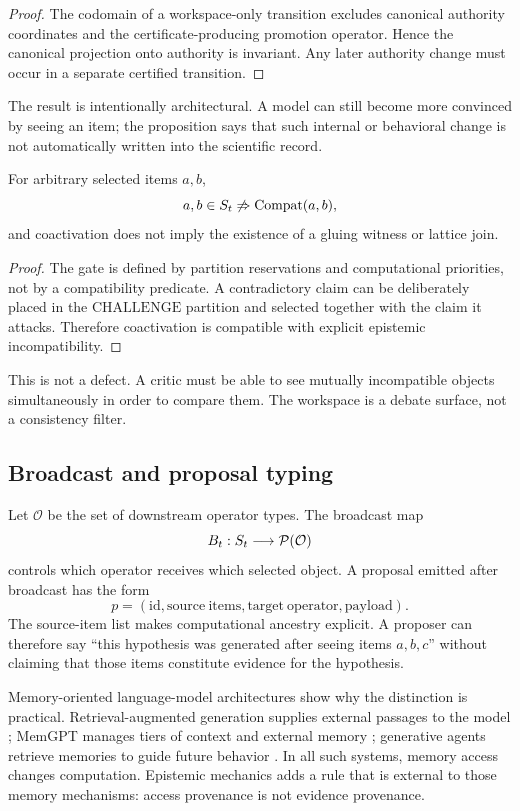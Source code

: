 \begin{proof}
The codomain of a workspace-only transition excludes canonical authority coordinates and the certificate-producing promotion operator. Hence the canonical projection onto authority is invariant. Any later authority change must occur in a separate certified transition.
\end{proof}

The result is intentionally architectural. A model can still become more convinced by seeing an item; the proposition says that such internal or behavioral change is not automatically written into the scientific record.

\begin{proposition}
For arbitrary selected items \(a,b\),
\[
a,b\in S_t\not\Rightarrow \operatorname{Compat}(a,b),
\]
and coactivation does not imply the existence of a gluing witness or lattice join.
\end{proposition}

\begin{proof}
The gate is defined by partition reservations and computational priorities, not by a compatibility predicate. A contradictory claim can be deliberately placed in the \(\mathrm{CHALLENGE}\) partition and selected together with the claim it attacks. Therefore coactivation is compatible with explicit epistemic incompatibility.
\end{proof}

This is not a defect. A critic must be able to see mutually incompatible objects simultaneously in order to compare them. The workspace is a debate surface, not a consistency filter.

\subsection{Broadcast and proposal typing}

Let \(\mathcal O\) be the set of downstream operator types. The broadcast map
\[
B_t:S_t\longrightarrow\mathcal P(\mathcal O)
\]
controls which operator receives which selected object. A proposal emitted after broadcast has the form
\[
p=(\mathrm{id},\mathrm{source\ items},\mathrm{target\ operator},\mathrm{payload}).
\]
The source-item list makes computational ancestry explicit. A proposer can therefore say ``this hypothesis was generated after seeing items \(a,b,c\)'' without claiming that those items constitute evidence for the hypothesis.

Memory-oriented language-model architectures show why the distinction is practical. Retrieval-augmented generation supplies external passages to the model \cite{lewis2020}; MemGPT manages tiers of context and external memory \cite{packer2023}; generative agents retrieve memories to guide future behavior \cite{park2023}. In all such systems, memory access changes computation. Epistemic mechanics adds a rule that is external to those memory mechanisms: access provenance is not evidence provenance.

